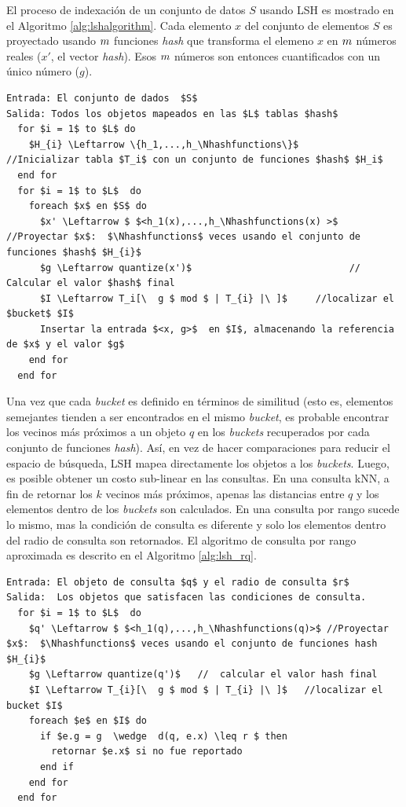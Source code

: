 El proceso de indexación de un conjunto de datos $S$ usando LSH es mostrado en el Algoritmo \ref{alg:lshalgorithm}. Cada elemento $x$ del conjunto de elementos $S$ es proyectado usando   $m$  funciones \textit{hash} que transforma el elemeno $x$ en $m$  números reales ($x'$, el vector \textit{hash}). Esos $m$  números son entonces cuantificados con un único número ($g$).

\newpage 
\begin{lstlisting}[mathescape, frame=single, label=alg:lshalgorithm,caption=Algoritmo de construcción para LSH]
Entrada: El conjunto de dados  $S$
Salida: Todos los objetos mapeados en las $L$ tablas $hash$
  for $i = 1$ to $L$ do
    $H_{i} \Leftarrow \{h_1,...,h_\Nhashfunctions\}$       //Inicializar tabla $T_i$ con un conjunto de funciones $hash$ $H_i$
  end for
  for $i = 1$ to $L$  do
    foreach $x$ en $S$ do
      $x' \Leftarrow $ $<h_1(x),...,h_\Nhashfunctions(x) >$  //Proyectar $x$:  $\Nhashfunctions$ veces usando el conjunto de funciones $hash$ $H_{i}$
      $g \Leftarrow quantize(x')$                            // Calcular el valor $hash$ final
      $I \Leftarrow T_i[\  g $ mod $ | T_{i} |\ ]$     //localizar el $bucket$ $I$
      Insertar la entrada $<x, g>$  en $I$, almacenando la referencia de $x$ y el valor $g$
    end for
  end for
\end{lstlisting}


Una vez que cada \textit{bucket} es definido en términos de similitud (esto es, elementos semejantes tienden a ser encontrados en el mismo \textit{bucket}, es probable encontrar los vecinos más próximos a un objeto $q$ en los \textit{buckets} recuperados por cada conjunto de funciones \textit{hash}). Así, en vez de hacer comparaciones para reducir el espacio de búsqueda, LSH mapea directamente los objetos a los \textit{buckets}. Luego, es posible obtener un costo sub-linear en las consultas. En una consulta kNN, a fin de retornar los $k$ vecinos más próximos, apenas las distancias entre $q$ y los elementos dentro de los \textit{buckets} son calculados. En una consulta por rango sucede lo mismo, mas la condición de consulta es diferente y solo los elementos dentro del radio de consulta son retornados. El algoritmo de consulta por rango aproximada es descrito en el Algoritmo  \ref{alg:lsh_rq}.

\begin{lstlisting}[mathescape, frame=single, label=alg:lsh_rq,caption=Consulta por rango aproximada usando LSH]
Entrada: El objeto de consulta $q$ y el radio de consulta $r$
Salida:  Los objetos que satisfacen las condiciones de consulta.
  for $i = 1$ to $L$  do
    $q' \Leftarrow $ $<h_1(q),...,h_\Nhashfunctions(q)>$ //Proyectar $x$:  $\Nhashfunctions$ veces usando el conjunto de funciones hash $H_{i}$
    $g \Leftarrow quantize(q')$   //  calcular el valor hash final
    $I \Leftarrow T_{i}[\  g $ mod $ | T_{i} |\ ]$   //localizar el bucket $I$
    foreach $e$ en $I$ do
      if $e.g = g  \wedge  d(q, e.x) \leq r $ then
        retornar $e.x$ si no fue reportado
      end if
    end for
  end for
\end{lstlisting}

